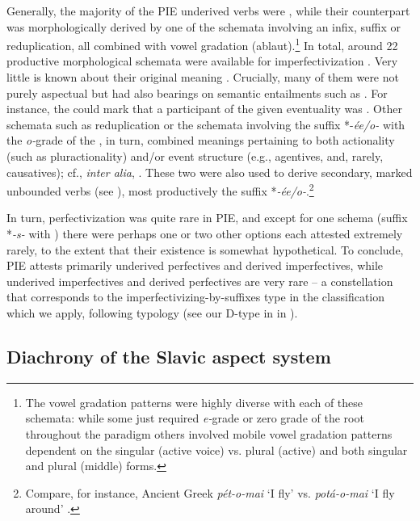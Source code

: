 \documentclass[output=paper]{langsci/langscibook}
\begin{document}
Generally, the majority of the PIE underived verbs were , while their  counterpart was morphologically derived by one of the schemata involving an infix, suffix or reduplication, all combined with vowel gradation (ablaut).\footnote{The vowel gradation patterns were highly diverse with each of these schemata: while some just required \textit{e-}grade or zero grade of the root throughout the paradigm others involved mobile vowel gradation patterns dependent on the singular (active voice) vs. plural (active) and both singular and plural (middle) forms.} In total, around 22 productive morphological schemata were available for imperfectivization \citep[14--21]{LIV2001}. Very little is known about their original meaning . Crucially, many of them were not purely aspectual but had also bearings on semantic entailments such as . For instance, the  could mark that a participant of the given eventuality was  \citep{Meiser1993}. Other schemata such as reduplication or the schemata involving the suffix *-\textit{ée/o-} with the \textit{o-}grade of the , in turn, combined meanings pertaining to both actionality (such as pluractionality) and/or event structure (e.g., agentives, and, rarely, causatives); cf., \textit{inter alia}, \citet{Kölligan2004}. These two were also used to derive secondary, marked unbounded verbs (see ), most productively the suffix *\textit{-ée/o-}.\footnote{Compare, for instance, Ancient Greek \textit{pét-o-mai} ‘I fly’ vs. \textit{potá-o-mai} ‘I fly around’ \citep[479]{LIV2001}.}

In turn, perfectivization was quite rare in PIE, and except for one schema (suffix *\textit{-s-} with ) there were perhaps one or two other options each attested extremely rarely, to the extent that their existence is somewhat hypothetical. To conclude, PIE attests primarily underived perfectives and derived imperfectives, while underived imperfectives and derived perfectives are very rare – a constellation that corresponds to the imperfectivizing-by-suffixes type in the classification which we apply, following  typology (see our D-type in  in ).

\subsection{Diachrony of the Slavic aspect system}\label{sec:wiemerserzant:3.2}
\end{document}
